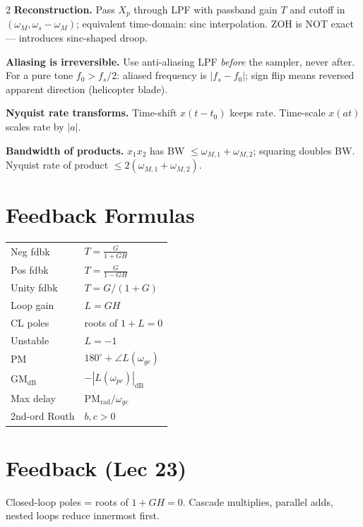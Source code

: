 \documentclass[11pt,landscape]{extarticle}
\begin{document}
\begin{paracol}{2}
\textbf{Reconstruction.} Pass $X_p$ through LPF with passband gain $T$ and cutoff in $(\omega_M,\omega_s{-}\omega_M)$; equivalent time-domain: sinc interpolation. ZOH is NOT exact --- introduces sinc-shaped droop.

\textbf{Aliasing is irreversible.} Use anti-aliasing LPF \emph{before} the sampler, never after. For a pure tone $f_0>f_s/2$: aliased frequency is $|f_s-f_0|$; sign flip means reversed apparent direction (helicopter blade).

\textbf{Nyquist rate transforms.} Time-shift $x(t-t_0)$ keeps rate. Time-scale $x(at)$ scales rate by $|a|$.

\textbf{Bandwidth of products.} $x_1 x_2$ has BW $\le \omega_{M,1}+\omega_{M,2}$; squaring doubles BW. Nyquist rate of product $\le 2(\omega_{M,1}+\omega_{M,2})$.

\switchcolumn*

\section*{Feedback Formulas}
\begin{tabular}{@{}l l@{}}
\toprule
Neg fdbk & $T{=}\tfrac{G}{1+GH}$ \\
Pos fdbk & $T{=}\tfrac{G}{1-GH}$ \\
Unity fdbk & $T{=}G/(1{+}G)$ \\
Loop gain & $L{=}GH$ \\
CL poles & roots of $1{+}L{=}0$ \\
Unstable & $L{=}{-}1$ \\
PM & $180^\circ{+}\angle L(\omega_{gc})$ \\
GM$_\mathrm{dB}$ & ${-}|L(\omega_{pc})|_\mathrm{dB}$ \\
Max delay & $\mathrm{PM}_\mathrm{rad}/\omega_{gc}$ \\
2nd-ord Routh & $b,c{>}0$ \\
\bottomrule
\end{tabular}

\switchcolumn

\section*{Feedback (Lec 23)}
Closed-loop poles = roots of $1+GH=0$. Cascade multiplies, parallel adds, nested loops reduce innermost first.


\end{paracol}
\end{document}
